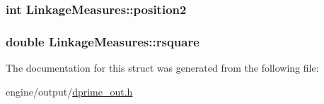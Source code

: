 \hypertarget{structLinkageMeasures_a9f62eba5ae27930276ea222ade2927c0}{
\subsubsection[{position2}]{\setlength{\rightskip}{0pt plus 5cm}int {\bf LinkageMeasures::position2}}}
\label{structLinkageMeasures_a9f62eba5ae27930276ea222ade2927c0}
\hypertarget{structLinkageMeasures_a11a1f44e1866dd30366bf44e753a9dfc}{
\subsubsection[{rsquare}]{\setlength{\rightskip}{0pt plus 5cm}double {\bf LinkageMeasures::rsquare}}}
\label{structLinkageMeasures_a11a1f44e1866dd30366bf44e753a9dfc}


The documentation for this struct was generated from the following file:\begin{DoxyCompactItemize}
\item 
engine/output/\hyperlink{dprime__out_8h}{dprime\_\-out.h}\end{DoxyCompactItemize}
